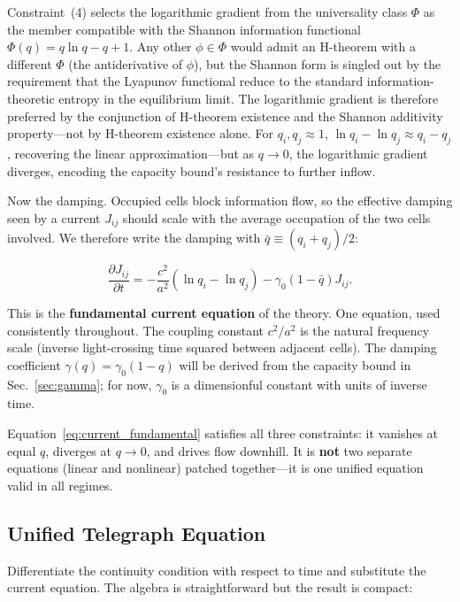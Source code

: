 \documentclass[aps,prd,twocolumn,showpacs,superscriptaddress,preprintnumbers]{revtex4-2}
\begin{document}
Constraint~(4) selects the logarithmic gradient from the universality class $\Phi$ as the member compatible with the Shannon information functional $\Phi(q)=q\ln q - q + 1$. Any other $\phi\in\Phi$ would admit an H-theorem with a different $\Phi$ (the antiderivative of $\phi$), but the Shannon form is singled out by the requirement that the Lyapunov functional reduce to the standard information-theoretic entropy in the equilibrium limit. The logarithmic gradient is therefore preferred by the conjunction of H-theorem existence and the Shannon additivity property---not by H-theorem existence alone.
For $q_i,q_j\approx1$, $\ln q_i-\ln q_j\approx q_i-q_j$, recovering the linear approximation---but as $q\to0$, the logarithmic gradient diverges, encoding the capacity bound's resistance to further inflow.

Now the damping.
Occupied cells block information flow, so the effective damping seen by a current $J_{ij}$ should scale with the average occupation of the two cells involved.
We therefore write the damping with $\bar{q}\equiv(q_i+q_j)/2$:

\begin{equation}
\boxed{\frac{\partial J_{ij}}{\partial t} = -\frac{c^2}{a^2}(\ln q_i - \ln q_j) - \gamma_0(1-\bar{q})J_{ij}}.
\label{eq:current_fundamental}
\end{equation}

This is the \textbf{fundamental current equation} of the theory.
One equation, used consistently throughout.
The coupling constant $c^2/a^2$ is the natural frequency scale (inverse light-crossing time squared between adjacent cells).
The damping coefficient $\gamma(q)=\gamma_0(1-q)$ will be derived from the capacity bound in Sec.~\ref{sec:gamma}; for now, $\gamma_0$ is a dimensionful constant with units of inverse time.

Equation~\eqref{eq:current_fundamental} satisfies all three constraints: it vanishes at equal $q$, diverges at $q\to0$, and drives flow downhill.
It is \textbf{not} two separate equations (linear and nonlinear) patched together---it is one unified equation valid in all regimes.

\subsection{Unified Telegraph Equation}

Differentiate the continuity condition with respect to time and substitute the current equation.
The algebra is straightforward but the result is compact:
\end{document}
